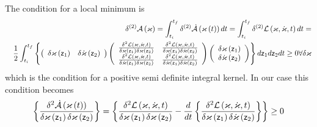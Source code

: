 The condition for a local minimum is 
\begin{eqnarray}
&&\delta ^{\left( 2\right) }{\cal A}\left( \varkappa \right)
=\int_{t_{i}}^{t_{f}}\delta ^{\left( 2\right) }{\cal \dot{A}}\left(
\varkappa \left( t\right) \right) dt=\int_{t_{i}}^{t_{f}}\delta ^{\left(
2\right) }{\cal L}\left( \varkappa ,\dot{\varkappa},t\right) dt=  \nonumber
\\
&&\frac{1}{2}\int_{t_{i}}^{t_{f}}\left\{ \left( 
\begin{array}{cc}
\delta \varkappa \left( {\sf z}_{1}\right) & \delta \dot{\varkappa}\left( 
{\sf z}_{2}\right)%
\end{array}%
\right) \left( 
\begin{array}{cc}
\frac{\delta ^{2}{\cal L}\left( \varkappa ,\dot{\varkappa},t\right) }{\delta
\varkappa \left( {\sf z}_{1}\right) \delta \varkappa \left( {\sf z}%
_{2}\right) } & \frac{\delta ^{2}{\cal L}\left( \varkappa ,\dot{\varkappa}%
,t\right) }{\delta \varkappa \left( {\sf z}_{1}\right) \delta \dot{\varkappa}%
\left( {\sf z}_{2}\right) } \\ 
\frac{\delta ^{2}{\cal L}\left( \varkappa ,\dot{\varkappa},t\right) }{\delta 
\dot{\varkappa}\left( {\sf z}_{1}\right) \delta \varkappa \left( {\sf z}%
_{2}\right) } & \frac{\delta ^{2}{\cal L}\left( \varkappa ,\dot{\varkappa}%
,t\right) }{\delta \dot{\varkappa}\left( {\sf z}_{1}\right) \delta \dot{%
\varkappa}\left( {\sf z}_{2}\right) }%
\end{array}%
\right) \left( 
\begin{array}{c}
\delta \varkappa \left( {\sf z}_{1}\right) \\ 
\delta \dot{\varkappa}\left( {\sf z}_{2}\right)%
\end{array}%
\right) \right\} d{\sf z}_{1}d{\sf z}_{2}dt\geq 0\forall \delta \varkappa
\end{eqnarray}%
which is the condition for a positive semi definite integral kernel. In our
case this condition becomes 
\begin{equation}
\left\{ \frac{\delta ^{2}{\cal \dot{A}}\left( \varkappa \left( t\right)
\right) }{\delta \varkappa \left( {\sf z}_{1}\right) \delta \varkappa \left( 
{\sf z}_{2}\right) }\right\} =\left\{ \frac{\delta ^{2}{\cal L}\left( {\cal %
\varkappa },{\cal \dot{\varkappa}},t\right) }{\delta \varkappa \left( {\sf z}%
_{1}\right) \delta \varkappa \left( {\sf z}_{2}\right) }-\frac{d}{dt}\left\{ 
\frac{\delta ^{2}{\cal L}\left( \varkappa ,\dot{\varkappa},t\right) }{\delta
\varkappa \left( {\sf z}_{1}\right) \delta \dot{\varkappa}\left( {\sf z}%
_{2}\right) }\right\} \right\} \geq 0  \label{ActHess}
\end{equation}%

